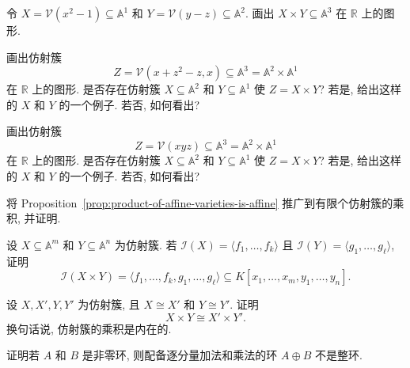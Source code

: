 \BookExerciseHeading
\begin{BookExercises}
  \item\label{ex:draw-product-finite-set-and-line} 令 $X=\mathcal{V}(x^{2}-1)\subseteq\mathbb{A}^{1}$ 和 $Y=\mathcal{V}(y-z)\subseteq\mathbb{A}^{2}$. 画出 $X\times Y\subseteq\mathbb{A}^{3}$ 在 $\mathbb{R}$ 上的图形.
  \item\label{ex:recognize-product-of-finite-sets} 画出仿射簇
  \[
    Z=\mathcal{V}(x+z^{2}-z,x)\subseteq\mathbb{A}^{3}=\mathbb{A}^{2}\times\mathbb{A}^{1}
  \]
  在 $\mathbb{R}$ 上的图形. 是否存在仿射簇 $X\subseteq\mathbb{A}^{2}$ 和 $Y\subseteq\mathbb{A}^{1}$ 使 $Z=X\times Y$? 若是, 给出这样的 $X$ 和 $Y$ 的一个例子. 若否, 如何看出?
  \item\label{ex:coordinate-planes-as-product-or-not} 画出仿射簇
  \[
    Z=\mathcal{V}(xyz)\subseteq\mathbb{A}^{3}=\mathbb{A}^{2}\times\mathbb{A}^{1}
  \]
  在 $\mathbb{R}$ 上的图形. 是否存在仿射簇 $X\subseteq\mathbb{A}^{2}$ 和 $Y\subseteq\mathbb{A}^{1}$ 使 $Z=X\times Y$? 若是, 给出这样的 $X$ 和 $Y$ 的一个例子. 若否, 如何看出?
  \item\label{ex:finite-product-of-affine-varieties} 将 Proposition~\ref{prop:product-of-affine-varieties-is-affine} 推广到有限个仿射簇的乘积, 并证明.
  \item\label{ex:product-ideal-from-generators} 设 $X\subseteq\mathbb{A}^{m}$ 和 $Y\subseteq\mathbb{A}^{n}$ 为仿射簇. 若 $\mathcal{I}(X)=\langle f_{1},\ldots,f_{k}\rangle$ 且 $\mathcal{I}(Y)=\langle g_{1},\ldots,g_{\ell}\rangle$, 证明
  \[
    \mathcal{I}(X\times Y)=\langle f_{1},\ldots,f_{k},g_{1},\ldots,g_{\ell}\rangle
      \subseteq K[x_{1},\ldots,x_{m},y_{1},\ldots,y_{n}].
  \]
  \item\label{ex:products-of-affine-varieties-are-intrinsic} 设 $X,X',Y,Y'$ 为仿射簇, 且 $X\cong X'$ 和 $Y\cong Y'$. 证明
  \[
    X\times Y\cong X'\times Y'.
  \]
  换句话说, 仿射簇的乘积是内在的.
  \item\label{ex:direct-sum-of-nonzero-rings-is-not-domain} 证明若 $A$ 和 $B$ 是非零环, 则配备逐分量加法和乘法的环 $A\oplus B$ 不是整环.
\end{BookExercises}
